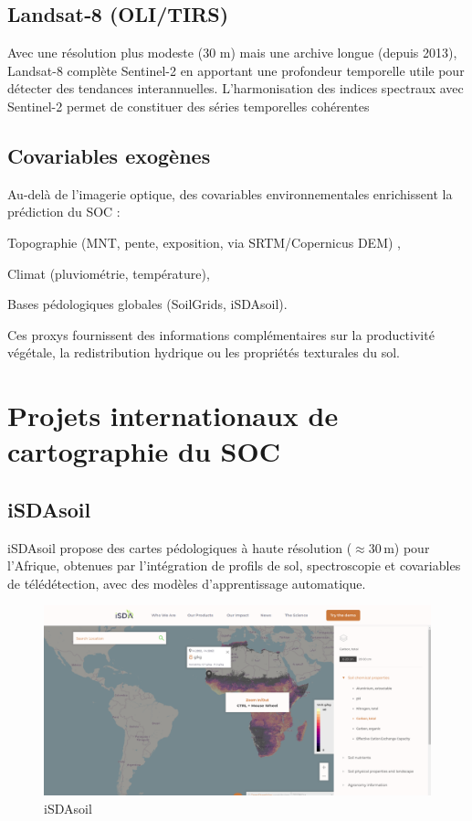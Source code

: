 \documentclass[12pt,a4paper,oneside]{report}
\begin{document}
\subsection{Landsat‑8 (OLI/TIRS)}
Avec une résolution plus modeste (30 m) mais une archive longue (depuis 2013), Landsat-8 \cite{landsat8} complète Sentinel-2 en apportant une profondeur temporelle utile pour détecter des tendances interannuelles. L’harmonisation des indices spectraux avec Sentinel-2 permet de constituer des séries temporelles cohérentes
\subsection{Covariables exogènes}
Au-delà de l’imagerie optique, des covariables environnementales enrichissent la prédiction du SOC :

Topographie (MNT, pente, exposition, via SRTM/Copernicus DEM) \cite{srtm,copernicusdem},

Climat (pluviométrie, température),

Bases pédologiques globales (SoilGrids, iSDAsoil).

Ces proxys fournissent des informations complémentaires sur la productivité végétale, la redistribution hydrique ou les propriétés texturales du sol.
\section{Projets internationaux de cartographie du SOC}
\subsection{iSDAsoil}
iSDAsoil \cite{isdasoil} propose des cartes pédologiques à haute résolution (\(\approx 30\,\text{m}\)) pour l’Afrique, obtenues par l’intégration de profils de sol, spectroscopie et covariables de télédétection, avec des modèles d’apprentissage automatique.
\begin{figure}[h]
    \centering
    \includegraphics[width=0.9\linewidth]{images/isda.png}
    \caption{ iSDAsoil}
    \label{fig:isda}
\end{figure}
\end{document}
